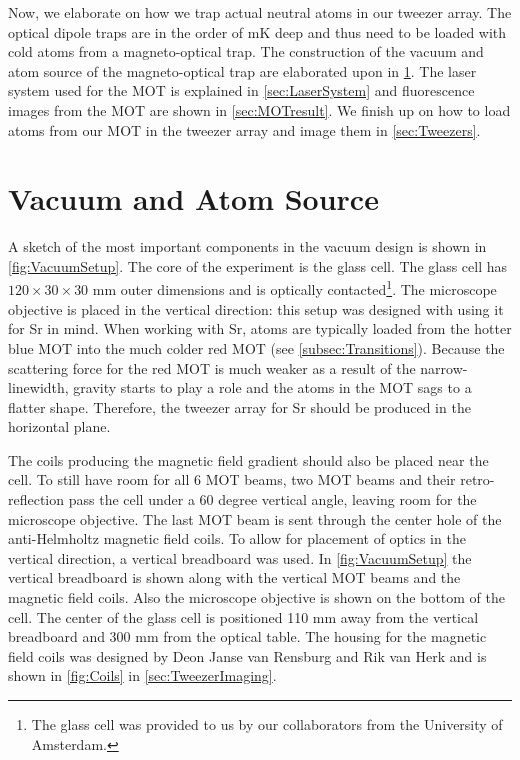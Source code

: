 Now, we elaborate on how we trap actual neutral atoms in our tweezer array. 
The optical dipole traps are in the order of mK deep and thus need to be loaded with cold atoms from a magneto-optical trap. 
The construction of the vacuum and atom source of the magneto-optical trap are elaborated upon in \cref{sec:VacuumAtom}.
The laser system used for the MOT is explained in \cref{sec:LaserSystem} and fluorescence images from the MOT are shown in \cref{sec:MOTresult}.
We finish up on how to load atoms from our MOT in the tweezer array and image them in \cref{sec:Tweezers}.

\section{Vacuum and Atom Source}\label{sec:VacuumAtom}

A sketch of the most important components in the vacuum design is shown in \cref{fig:VacuumSetup}.
The core of the experiment is the glass cell.
The glass cell has $120\times30\times30$ mm outer dimensions and is optically contacted\footnote{The glass cell was provided to us by our collaborators from the University of Amsterdam.}.
The microscope objective is placed in the vertical direction: this setup was designed with using it for Sr in mind.
When working with Sr, atoms are typically loaded from the hotter blue MOT into the much colder red MOT (see \cref{subsec:Transitions}).
Because the scattering force for the red MOT is much weaker as a result of the narrow-linewidth, gravity starts to play a role and the atoms in the MOT sags to a flatter shape. 
Therefore, the tweezer array for Sr should be produced in the horizontal plane. 

The coils producing the magnetic field gradient should also be placed near the cell. 
To still have room for all 6 MOT beams, two MOT beams and their retro-reflection pass the cell under a 60 degree vertical angle, leaving room for the microscope objective. 
The last MOT beam is sent through the center hole of the anti-Helmholtz magnetic field coils.
To allow for placement of optics in the vertical direction, a vertical breadboard was used. 
In \cref{fig:VacuumSetup} the vertical breadboard is shown along with the vertical MOT beams and the magnetic field coils. 
Also the microscope objective is shown on the bottom of the cell.
The center of the glass cell is positioned 110 mm away from the vertical breadboard and 300 mm from the optical table. 
The housing for the magnetic field coils was designed by Deon Janse van Rensburg and Rik van Herk and is shown in \cref{fig:Coils} in \cref{sec:TweezerImaging}.

